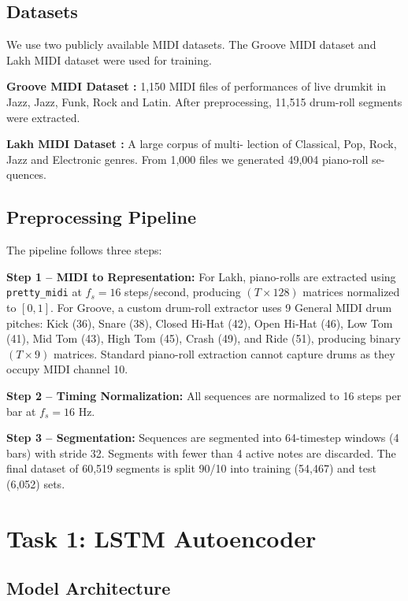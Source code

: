 \documentclass[conference]{IEEEtran}
\begin{document}
\subsection{Datasets}

We use two publicly available MIDI datasets. The Groove MIDI dataset \cite{b1} and Lakh MIDI dataset \cite{b2} were used for training.

\textbf{Groove MIDI Dataset \cite{b1}:} 1,150 MIDI files of
performances of live drumkit in Jazz,
Jazz, Funk, Rock and Latin. After preprocessing, 11,515 drum-roll
segments were extracted.

\textbf{Lakh MIDI Dataset \cite{b2}:}  A large corpus of multi-
lection of Classical, Pop, Rock, Jazz and Electronic
genres. From 1,000 files we generated 49,004 piano-roll se-
quences.

\subsection{Preprocessing Pipeline}

The pipeline follows three steps:

\textbf{Step 1 -- MIDI to Representation:} For Lakh, piano-rolls are extracted using \texttt{pretty\_midi} at $f_s = 16$ steps/second, producing $(T \times 128)$ matrices normalized to $[0,1]$. For Groove, a custom drum-roll extractor uses 9 General MIDI drum pitches: Kick (36), Snare (38), Closed Hi-Hat (42), Open Hi-Hat (46), Low Tom (41), Mid Tom (43), High Tom (45), Crash (49), and Ride (51), producing binary $(T \times 9)$ matrices. Standard piano-roll extraction cannot capture drums as they occupy MIDI channel 10.

\textbf{Step 2 -- Timing Normalization:} All sequences are normalized to 16 steps per bar at $f_s = 16$ Hz.

\textbf{Step 3 -- Segmentation:} Sequences are segmented into 64-timestep windows (4 bars) with stride 32. Segments with fewer than 4 active notes are discarded. The final dataset of 60,519 segments is split 90/10 into training (54,467) and test (6,052) sets.

\section{Task 1: LSTM Autoencoder}

\subsection{Model Architecture}
\end{document}
